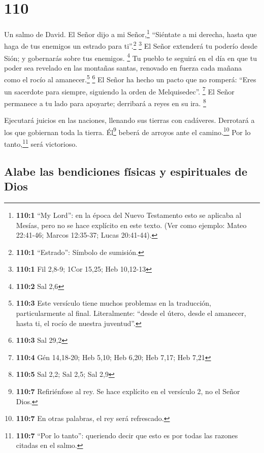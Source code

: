 \hypertarget{section-109}{%
\section{110}\label{section-109}}

Un salmo de David.  El Señor dijo a mi Señor,\footnote{\textbf{110:1}
  ``My Lord'': en la época del Nuevo Testamento esto se aplicaba al
  Mesías, pero no se hace explícito en este texto. (Ver como ejemplo:
  Mateo 22:41-46; Marcos 12:35-37; Lucas 20:41-44).} ``Siéntate a mi
derecha, hasta que haga de tus enemigos un estrado para ti''.\footnote{\textbf{110:1}
  ``Estrado'': Símbolo de sumisión.} \footnote{\textbf{110:1} Fil 2,8-9;
  1Cor 15,25; Heb 10,12-13}  El Señor extenderá tu poderío
desde Sión; y gobernarás sobre tus enemigos. \footnote{\textbf{110:2}
  Sal 2,6}  Tu pueblo te seguirá en el día en que tu poder
sea revelado en las montañas santas, renovado en fuerza cada mañana como
el rocío al amanecer.\footnote{\textbf{110:3} Este versículo tiene
  muchos problemas en la traducción, particularmente al final.
  Literalmente: ``desde el útero, desde el amanecer, hasta ti, el rocío
  de nuestra juventud''.} \footnote{\textbf{110:3} Sal 29,2}
 El Señor ha hecho un pacto que no romperá: ``Eres un
sacerdote para siempre, siguiendo la orden de Melquisedec''. \footnote{\textbf{110:4}
  Gén 14,18-20; Heb 5,10; Heb 6,20; Heb 7,17; Heb 7,21} 
El Señor permanece a tu lado para apoyarte; derribará a reyes en su ira.
\footnote{\textbf{110:5} Sal 2,2; Sal 2,5; Sal 2,9}

 Ejecutará juicios en las naciones, llenando sus tierras
con cadáveres. Derrotará a los que gobiernan toda la tierra.
 Él\footnote{\textbf{110:7} Refiriénfose al rey. Se hace
  explícito en el versículo 2, no el Señor Dios.} beberá de arroyos ante
el camino.\footnote{\textbf{110:7} En otras palabras, el rey será
  refrescado.} Por lo tanto,\footnote{\textbf{110:7} ``Por lo tanto'':
  queriendo decir que esto es por todas las razones citadas en el salmo.}
será victorioso.

\hypertarget{alabe-las-bendiciones-fuxedsicas-y-espirituales-de-dios}{%
\subsection{Alabe las bendiciones físicas y espirituales de
Dios}\label{alabe-las-bendiciones-fuxedsicas-y-espirituales-de-dios}}

